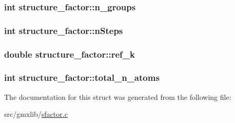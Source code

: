\hypertarget{structstructure__factor_a247c244fcc69451b2ea8aa55d1de80f2}{
\subsubsection[{n\-\_\-groups}]{\setlength{\rightskip}{0pt plus 5cm}int {\bf structure\-\_\-factor\-::n\-\_\-groups}}}\label{structstructure__factor_a247c244fcc69451b2ea8aa55d1de80f2}
\hypertarget{structstructure__factor_a2097f05e9640df0b9a783213601a2007}{
\subsubsection[{n\-Steps}]{\setlength{\rightskip}{0pt plus 5cm}int {\bf structure\-\_\-factor\-::n\-Steps}}}\label{structstructure__factor_a2097f05e9640df0b9a783213601a2007}
\hypertarget{structstructure__factor_a1e91547f9f5cb127b296878a2bbaee8a}{
\subsubsection[{ref\-\_\-k}]{\setlength{\rightskip}{0pt plus 5cm}double {\bf structure\-\_\-factor\-::ref\-\_\-k}}}\label{structstructure__factor_a1e91547f9f5cb127b296878a2bbaee8a}
\hypertarget{structstructure__factor_a7d26b02199094812c82409bebca4809e}{
\subsubsection[{total\-\_\-n\-\_\-atoms}]{\setlength{\rightskip}{0pt plus 5cm}int {\bf structure\-\_\-factor\-::total\-\_\-n\-\_\-atoms}}}\label{structstructure__factor_a7d26b02199094812c82409bebca4809e}


\-The documentation for this struct was generated from the following file\-:\begin{DoxyCompactItemize}
\item 
src/gmxlib/\hyperlink{sfactor_8c}{sfactor.\-c}\end{DoxyCompactItemize}
